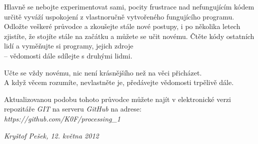 \documentclass[10pt,twoside=true,open=right,cleardoublepage=empty,chapterprefix=true]{scrbook}
\begin{document}
Hlavně se nebojte experimentovat sami, pocity frustrace nad nefungujícím kódem určitě vyváží uspokojení z vlastnoručně vytvořeného fungujícího programu. Odložte veškeré průvodce a zkoušejte stále nové postupy, i po několika letech zjistíte, že stojíte stále na začátku a můžete se učit novému. Čtěte kódy ostatních lidí a vyměňujte si programy, jejich zdroje \\-- vědomosti dále sdílejte s druhými lidmi.

Učte se vždy novému, nic není krásnějšího než na věci přicházet. \\A když věcem rozumíte, nevlastněte je, předávejte vědomosti trpělivě dále.

\vfill

Aktualizovanou podobu tohoto průvodce můžete najít v elektronické verzi repozitáře {\em GIT} na serveru {\em GitHub} na adrese:\\
{\em https://github.com/K0F/processing\_1}

\begin{flushright}
{\em Kryštof Pešek, 12. května 2012}
\end{flushright}

\printglossaries

\printindex


%
\nocite{*}
\printbibliography[title=Bibliografie]
\end{document}
